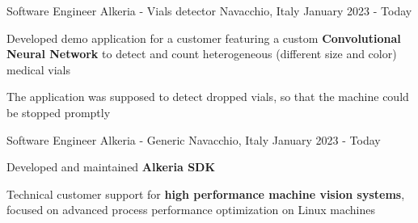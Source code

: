 \begin{cventries}
  \cventry
    {Software Engineer} %
    {Alkeria - Vials detector} %
    {Navacchio, Italy} %
    {January 2023 - Today} %
    {
      \begin{cvitems} %
        \item {Developed demo application for a customer featuring a custom \textbf{Convolutional Neural Network} to detect and count
        heterogeneous (different size and color) medical vials}
        \item {The application was supposed to detect dropped vials, so that the machine could be stopped promptly}
      \end{cvitems}
    }

  \cventry
    {Software Engineer} %
    {Alkeria - Generic} %
    {Navacchio, Italy} %
    {January 2023 - Today} %
    {
      \begin{cvitems} %
        \item {Developed and maintained \textbf{Alkeria SDK}}
        \item {Technical customer support for \textbf{high performance machine vision systems}, focused on advanced process performance optimization on Linux machines}
      \end{cvitems}
    }



\end{cventries}

